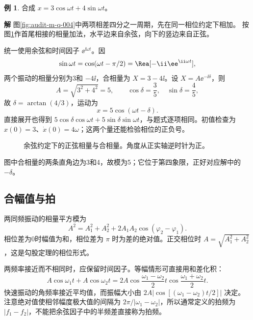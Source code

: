 \documentclass[11pt,openany,fontset=fandol]{ctexbook}
\theoremstyle{plain}\newtheorem{theorem}{定理}[chapter]\newtheorem{proposition}[theorem]{命题}
\theoremstyle{definition}\newtheorem{definition}{定义}[chapter]\newtheorem{example}{例}[chapter]
\theoremstyle{remark}\newtheorem*{remark}{说明}
\newcommand{\SolutionStart}{\par\nobreak\medskip\nobreak\noindent\textbf{解}\quad\ignorespaces}
\newenvironment{solution}{\SolutionStart}{\par\medskip}
\begin{document}
\begin{example}
合成 $x=3\cos\omega t+4\sin\omega t$。
\end{example}

\begin{solution}
图\ref{fig:audit-m-q-004}中两项相差四分之一周期，先在同一相位约定下相加。
按图\ref{fig:orig-003}作首尾相接的相量加法，水平边来自余弦，向下的竖边来自正弦。

统一使用余弦和时间因子 $\ee^{\ii\omega t}$。因
\[
\sin\omega t=\cos(\omega t-\pi/2)
=\Rea[-\ii\ee^{\ii\omega t}],
\]
两个振动的相量分别为3和 $-4\ii$，合相量为 $X=3-4\ii$。设 $X=A\ee^{-\ii\delta}$，则
\[
A=\sqrt{3^2+4^2}=5,\qquad
\cos\delta=\frac35,\quad\sin\delta=\frac45,
\]
故 $\delta=\arctan(4/3)$，运动为
\[
x=5\cos(\omega t-\delta).
\]
直接展开也得到 $5\cos\delta\cos\omega t+5\sin\delta\sin\omega t$，与题式逐项相同。初值检查为 $x(0)=3$、$\dot x(0)=4\omega$；这两个量还能检验相位的正负号。

\begin{figure}[H]\centering
{}
\caption{余弦约定下的正弦相量与合相量。角度从正实轴逆时针为正。}
\label{fig:orig-003}
\end{figure}

图中合相量的两条直角边为3和4，故模为5；它位于第四象限，正好对应解中的 $-\delta$。
\end{solution}

\subsection{合幅值与拍}
两同频振动的相量平方模为
\begin{equation}
A^2=A_1^2+A_2^2+2A_1A_2\cos(\varphi_2-\varphi_1).
\end{equation}
相位差为0时幅值为和，相位差为 $\pi$ 时为差的绝对值。正交相位时 $A=\sqrt{A_1^2+A_2^2}$，这是勾股定理的相位形式。

两频率接近而不相同时，应保留时间因子。等幅情形可直接用和差化积：
\begin{equation}
A\cos\omega_1t+A\cos\omega_2t
=2A\cos\frac{\omega_1-\omega_2}{2}t\cos\frac{\omega_1+\omega_2}{2}t.
\end{equation}
快速振动的角频率接近平均值，而振幅大小由 $2A|\cos[(\omega_1-\omega_2)t/2]|$ 决定。注意绝对值使相邻幅度极大值的间隔为 $2\pi/|\omega_1-\omega_2|$，所以通常定义的拍频为 $|f_1-f_2|$，不能把余弦因子中的半频差直接称为拍频。
\end{document}
